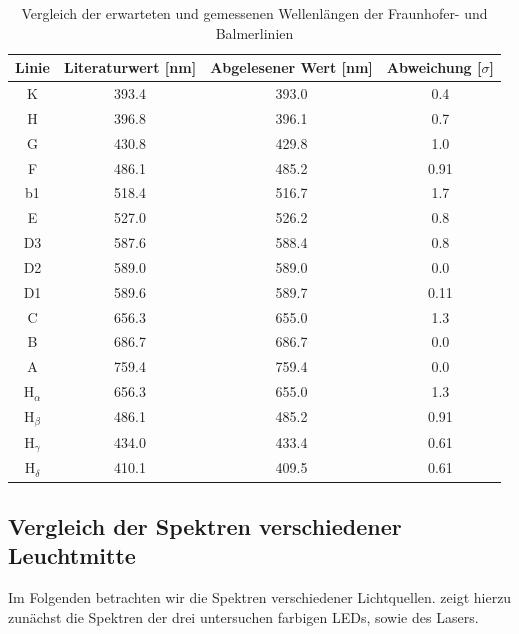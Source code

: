\begin{table}[h]
  \centering
  \caption{Vergleich der erwarteten und gemessenen Wellenlängen der Fraunhofer- und Balmerlinien}
  \vspace*{0.5em}
  \begin{tabular}{c|c|c|c}
      \hline
      Linie & Literaturwert [nm] & Abgelesener Wert [nm] & Abweichung [$\sigma$] \\
      \hline
      K  & 393.4 & 393.0 & 0.4 \\
      H  & 396.8 & 396.1 & 0.7 \\
      G  & 430.8 & 429.8 & 1.0 \\
      F  & 486.1 & 485.2 & 0.91 \\
      b1 & 518.4 & 516.7 & 1.7 \\
      E  & 527.0 & 526.2 & 0.8 \\
      D3 & 587.6 & 588.4 & 0.8 \\
      D2 & 589.0 & 589.0 & 0.0 \\
      D1 & 589.6 & 589.7 & 0.11 \\
      C  & 656.3 & 655.0 & 1.3 \\
      B  & 686.7 & 686.7 & 0.0 \\
      A  & 759.4 & 759.4 & 0.0 \\
      \hline\hline
      $\mathrm{H}_{\alpha}$ & 656.3 & 655.0 & 1.3\\
      $\mathrm{H}_{\beta}$ & 486.1 & 485.2 & 0.91\\
      $\mathrm{H}_{\gamma}$ & 434.0 & 433.4 & 0.61\\
      $\mathrm{H}_{\delta}$ & 410.1 & 409.5 & 0.61\\
      \hline
  \end{tabular}
  \label{tab:fraunhofer_vergleich}
\end{table}

\newpage

\subsection{Vergleich der Spektren verschiedener Leuchtmitte}

Im Folgenden betrachten wir die Spektren verschiedener Lichtquellen.  zeigt hierzu zunächst die Spektren der drei untersuchen farbigen LEDs, sowie des Lasers.

